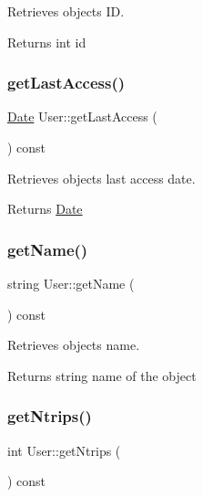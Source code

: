 Retrieves object\textquotesingle{}s ID. 

\begin{DoxyReturn}{Returns}
int id 
\end{DoxyReturn}
\mbox{\label{group___user_ga9399e8ad03d939281357fe2e1d2a0f71}} 
\subsubsection{\texorpdfstring{get\+Last\+Access()}{getLastAccess()}}
{\footnotesize\ttfamily \hyperlink{class_date}{Date} User\+::get\+Last\+Access (\begin{DoxyParamCaption}{ }\end{DoxyParamCaption}) const}



Retrieves object\textquotesingle{}s last access date. 

\begin{DoxyReturn}{Returns}
\hyperlink{class_date}{Date} 
\end{DoxyReturn}
\mbox{\label{group___user_gab9b2b5feb6bdd1582696eb6d44cee384}} 
\subsubsection{\texorpdfstring{get\+Name()}{getName()}}
{\footnotesize\ttfamily string User\+::get\+Name (\begin{DoxyParamCaption}{ }\end{DoxyParamCaption}) const}



Retrieves object\textquotesingle{}s name. 

\begin{DoxyReturn}{Returns}
string name of the object 
\end{DoxyReturn}
\mbox{\label{group___user_gadfbbdc7ea72e051b7b7b8d41c14eb846}} 
\subsubsection{\texorpdfstring{get\+Ntrips()}{getNtrips()}}
{\footnotesize\ttfamily int User\+::get\+Ntrips (\begin{DoxyParamCaption}{ }\end{DoxyParamCaption}) const}



